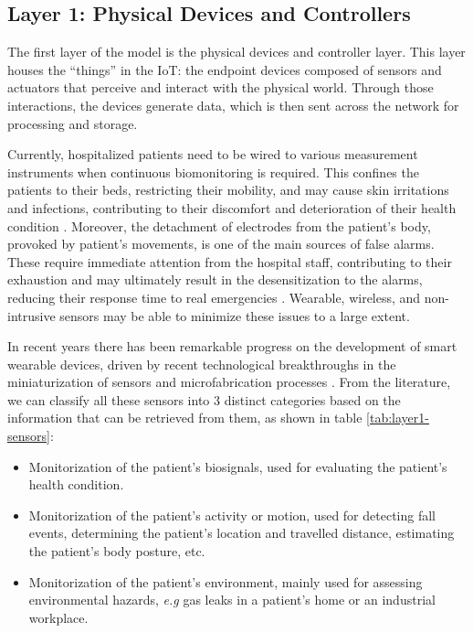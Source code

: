 \subsection{Layer 1: Physical Devices and Controllers}
\label{sec:iot-model-layer1}

The first layer of the model is the physical devices and controller layer. This layer houses the ``things'' in the \acl{IoT}: the endpoint devices composed of sensors and actuators that perceive and interact with the physical world. Through those interactions, the devices generate data, which is then sent across the network for processing and storage. \bigskip

Currently, hospitalized patients need to be wired to various measurement instruments when continuous biomonitoring is required. This confines the patients to their beds, restricting their mobility, and may cause skin irritations and infections, contributing to their discomfort and deterioration of their health condition \cite{Darwish2011}. %
Moreover, the detachment of electrodes from the patient's body, provoked by patient's movements, is one of the main sources of false alarms. These require immediate attention from the hospital staff, contributing to their exhaustion and may ultimately result in the desensitization to the alarms, reducing their response time to real emergencies \cite{DursunErgezen2020}. Wearable, wireless, and non-intrusive sensors may be able to minimize these issues to a large extent. \bigskip

In recent years there has been remarkable progress on the development of smart wearable devices, driven by recent technological breakthroughs in the miniaturization of sensors and microfabrication processes \cite{Adame2018}. From the literature, we can classify all these sensors into 3 distinct categories based on the information that can be retrieved from them, as shown in table \ref{tab:layer1-sensors}:

\begin{itemize}
    \item Monitorization of the patient's biosignals, used for evaluating the patient's health condition.
    \item Monitorization of the patient's activity or motion, used for detecting fall events, determining the patient's location and travelled distance, estimating the patient's body posture, etc.
    \item Monitorization of the patient's environment, mainly used for assessing environmental hazards, \textit{e.g} gas leaks in a patient's home or an industrial workplace.
\end{itemize}

